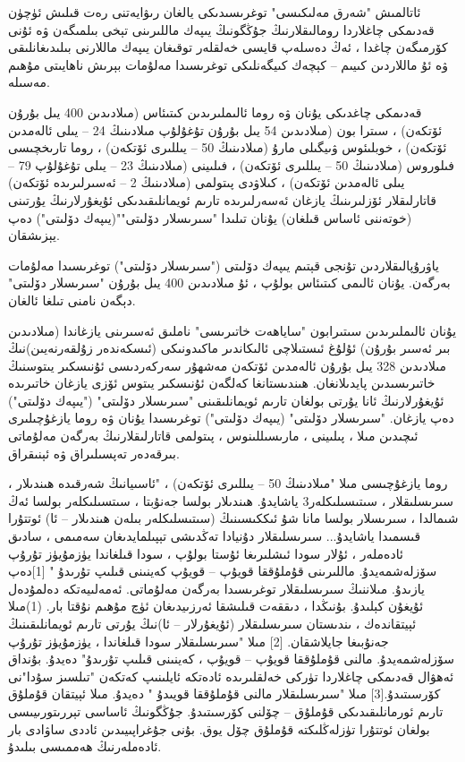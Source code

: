 \documentclass[a4paper]{article}
\begin{document}
\begin{flushright}
ئاتالمىش "شەرق مەلىكىسى" توغرىسىدىكى يالغان رىۋايەتنى رەت قىلىش ئۈچۈن قەدىمكى چاغلاردا رومالىقلارنىڭ جۇڭگونىڭ يىپەك ماللىرىنى تېخى بىلمىگەن ۋە ئۇنى كۆرمىگەن چاغدا ، ئەڭ دەسلەپ قايسى خەلقلەر توقىغان يىپەك ماللارنى بىلىدىغانلىقى ۋە ئۇ ماللاردىن كىيىم – كېچەك كىيگەنلىكى توغرىسىدا مەلۇمات بېرىش ناھايىتى مۇھىم مەسىلە.



قەدىمكى چاغدىكى يۇنان ۋە روما ئالىملىرىدىن كىتىئاس (مىلادىدىن 400 يىل بۇرۇن ئۆتكەن) ، سىترا بون (مىلادىدىن 54 يىل بۇرۇن تۇغۇلۇپ مىلادىنىڭ 24 – يىلى ئالەمدىن ئۆتكەن) ، خوبلىئوس ۋىيگىلى مارۇ (مىلادىنىڭ 50 – يىللىرى ئۆتكەن) ، روما تارىخچىسى فىلوروس (مىلادىنىڭ 50 – يىللىرى ئۆتكەن) ، فىلىينى (مىلادىنىڭ 23 – يىلى تۇغۇلۇپ 79 – يىلى ئالەمدىن ئۆتكەن) ، كىلاۋدى پىتولمى (مىلادىنىڭ 2 – ئەسىرلىرىدە ئۆتكەن) قاتارلىقلار ئۆزلىرىنىڭ يازغان ئەسەرلىرىدە تارىم ئويمانلىقىدىكى ئۇيغۇرلارنىڭ يۇرتىنى (خوتەننى ئاساس قىلغان) يۇنان تىلىدا "سىرىسلار دۆلىتى""(يىپەك دۆلىتى") دەپ يېزىشقان.



ياۋرۇپالىقلاردىن تۇنجى قېتىم يىپەك دۆلىتى ("سىرىسلار دۆلىتى") توغرىسىدا مەلۇمات بەرگەن. يۇنان ئالىمى كىتىئاس بولۇپ ، ئۇ مىلادىدىن 400 يىل بۇرۇن "سىرىسلار دۆلىتى" دېگەن نامنى تىلغا ئالغان.



يۇنان ئالىملىرىدىن سىتىرابون "ساياھەت خاتىرىسى" ناملىق ئەسىرىنى يازغاندا (مىلادىدىن بىر ئەسىر بۇرۇن) ئۇلۇغ ئىستىلاچى ئالىكاندىر ماكىدونىكى (ئىسكەندەر زۇلقەرنەيىن)نىڭ مىلادىدىن 328 يىل بۇرۇن ئالەمدىن ئۆتكەن مەشھۇر سەركەردىسى ئۇنىسكىر يىتوسنىڭ خاتىرىسىدىن پايدىلانغان. ھىندىستانغا كەلگەن ئۇنىسكىر يىتوس ئۆزى يازغان خاتىرىدە ئۇيغۇرلارنىڭ ئانا يۇرتى بولغان تارىم ئويمانلىقىنى "سىرىسلار دۆلىتى" ("يىپەك دۆلىتى") دەپ يازغان. "سىرىسلار دۆلىتى" (يىپەك دۆلىتى") توغرىسىدا يۇنان ۋە روما يازغۇچىلىرى ئىچىدىن مىلا ، پىلىينى ، مارىسىللىنوس ، پىتولمى قاتارلىقلارنىڭ بەرگەن مەلۇماتى بىرقەدەر تەپسىلىراق ۋە ئېنىقراق.



روما يازغۇچىسى مىلا "مىلادىنىڭ 50 – يىللىرى ئۆتكەن) ، "ئاسىيانىڭ شەرقىدە ھىندىلار ، سىرىسلىقلار ، سىتىسىلىكلەر3 ياشايدۇ. ھىندىلار بولسا جەنۇبتا ، سىتسىلىكلەر بولسا ئەڭ شىمالدا ، سىرىسلار بولسا مانا شۇ ئىككىسىنىڭ (سىتىسلىكلەر بىلەن ھىندىلار – ئا) ئوتتۇرا قىسمىدا ياشايدۇ... سىرىسلىقلار دۇنيادا تەڭدىشى تېپىلمايدىغان سەمىمى ، سادىق ئادەملەر ، ئۇلار سودا ئىشلىرىغا ئۇستا بولۇپ ، سودا قىلغاندا يۈزمۇيۈز تۇرۇپ سۆزلەشمەيدۇ. ماللىرىنى قۇملۇققا قويۇپ – قويۇپ كەينىنى قىلىپ تۇرىدۇ " [1]دەپ يازىدۇ. مىلاننىڭ سىرىسلىقلار توغرىسىدا بەرگەن مەلۇماتى. ئەمەلىيەتكە دەلمۇدەل ئۇيغۇن كېلىدۇ. بۇنىڭدا ، دىققەت قىلىشقا ئەرزىيدىغان ئۈچ مۇھىم نۇقتا بار. (1)مىلا ئېيتقاندەك ، ىندىستان سىرىسلىقلار (ئۇيغۇرلار – ئا)نىڭ يۇرتى تارىم ئويمانلىقىنىڭ جەنۇبىغا جايلاشقان. [2] مىلا "سىرىسلىقلار سودا قىلغاندا ، يۈزمۇيۈز تۇرۇپ سۆزلەشمەيدۇ. مالنى قۇملۇققا قويۇپ – قويۇپ ، كەينىنى قىلىپ تۇرىدۇ" دەيدۇ. بۇنداق ئەھۋال قەدىمكى چاغلاردا تۈركى خەلقلىرىدە ئادەتكە ئايلىنىپ كەتكەن "تىلسىز سۇدا"نى كۆرسىتىدۇ.[3] مىلا "سىرىسلىقلار مالنى قۇملۇققا قويىدۇ " دەيدۇ. مىلا ئېيتقان قۇملۇق تارىم ئورمانلىقىدىكى قۇملۇق – چۆلنى كۆرسىتىدۇ. جۇڭگونىڭ ئاساسى تېررىتورىيىسى بولغان ئوتتۇرا تۈزلەڭلىكتە قۇملۇق چۆل يوق. بۇنى جۇغراپىيىدىن ئاددى ساۋادى بار ئادەملەرنىڭ ھەممىسى بىلىدۇ.




\end{flushright}
\end{document}
